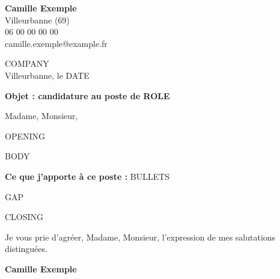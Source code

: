 \documentclass[11pt,a4paper]{article}
\begin{document}
\textbf{Camille Exemple}\\
Villeurbanne (69)\\
06 00 00 00 00\\
camille.exemple@example.fr

\begin{flushright}
{{COMPANY}}\\[1em]
Villeurbanne, le {{DATE}}
\end{flushright}

\textbf{Objet : candidature au poste de {{ROLE}}}

Madame, Monsieur,

{{OPENING}}

{{BODY}}

\textbf{Ce que j'apporte à ce poste :}
{{BULLETS}}

{{GAP}}

{{CLOSING}}

Je vous prie d'agréer, Madame, Monsieur, l'expression de mes salutations distinguées.

\vspace{1em}
\textbf{Camille Exemple}
\end{document}
